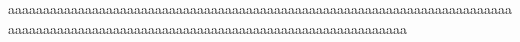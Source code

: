 \documentclass{article}
\begin{document}
aaaaaaaaaaaaaaaaaaaaaaaaaaaaaaaaaaaaaaaaaaaaaaaaaaaaaaaaaaaaaaaaaaaaaaaaaaaaaaaaaaaaaaaaaaaaaaaaaaaaaaaaaaaaaaaaaaaaaaaaaaaaaaaaa
\end{document}
